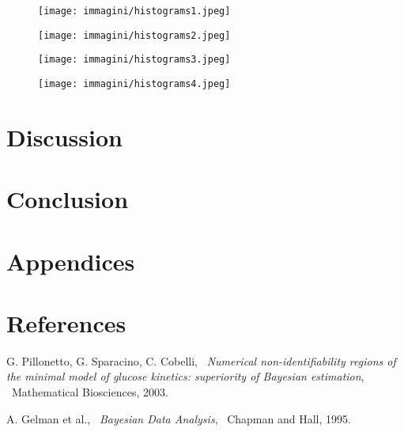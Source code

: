 \documentclass[a4paper,10pt]{report}
\begin{document}
\begin{figure}[h!]
    \centering
    \begin{minipage}{0.65\textwidth}
        \centering
        \texttt{[image: immagini/histograms1.jpeg]}
        \label{fig:immagine1}
    \end{minipage}
    \hfill
    \begin{minipage}{0.65\textwidth}
        \centering
        \texttt{[image: immagini/histograms2.jpeg]}
        \label{fig:immagine2}
    \end{minipage}
     \hfill
    \begin{minipage}{0.65\textwidth}
        \centering
        \texttt{[image: immagini/histograms3.jpeg]}
        \label{fig:immagine2}
    \end{minipage}
    \hfill
    \begin{minipage}{0.65\textwidth}
        \centering
        \texttt{[image: immagini/histograms4.jpeg]}
        \label{fig:immagine2}
    \end{minipage}
\end{figure}


\section{Discussion}


\section{Conclusion}


\section*{Appendices}


\section*{References}
\begin{thebibliography}{9}
G. Pillonetto, G. Sparacino, C. Cobelli, \
\textit{Numerical non-identifiability regions of the minimal model of glucose kinetics: superiority of Bayesian estimation}, \
Mathematical Biosciences, 2003.

A. Gelman et al., \
\textit{Bayesian Data Analysis}, \
Chapman and Hall, 1995.

\end{thebibliography}
\end{document}
